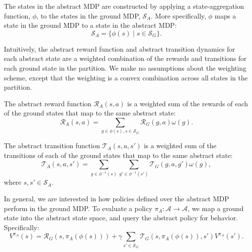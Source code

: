 
The states in the abstract \ac{MDP} are constructed by applying a state-aggregation function, $\phi$, to the states in the ground \ac{MDP}, $\mathcal{S}_A$. More specifically, $\phi$ maps a state in the ground \ac{MDP} to a state in the abstract \ac{MDP}:
\begin{equation}
\mathcal{S}_A = \{ \phi(s) \mid s \in \mathcal{S}_G\}.
\end{equation}

Intuitively, the abstract reward function and abstract transition dynamics for each abstract state are a weighted combination of the rewards and transitions for each ground state in the partition. We make no assumptions about the weighting scheme, except that the weighting is a convex combination across all states in the partition.

The abstract reward function $\mathcal{R}_A(s,a)$ is a weighted sum of the rewards of each of the ground states that map to the same abstract state:
\begin{equation}
\mathcal{R}_A(s,a) = \sum_{g \in \phi(s), s \in \mathcal{S}_G} \mathcal{R}_G(g,a) \omega(g) .
\end{equation}

The abstract transition function $\mathcal{T}_A(s,a,s')$ is a weighted sum of the transitions of each of the ground states that map to the same abstract state:
\begin{equation}
\mathcal{T}_A(s,a,s') = \sum_{g \in \phi^{-1}(s)} \sum_{g' \in \phi^{-1}(s')} \mathcal{T}_G(g,a,g') \omega(g),
\end{equation}
\noindent where $
s, s' \in \mathcal{S}_A
$.

In general, we are interested in how policies defined over the abstract \ac{MDP} perform in the ground \ac{MDP}. To evaluate a policy $\pi_A:\mathcal{A}\rightarrow\mathcal{A}$, we map a ground state into the abstract state space, and query the abstract policy for behavior. Specifically:
\begin{equation}
V^{\pi_A}(s) = \mathcal{R}_G(s,\pi_A(\phi(s))) + \gamma \sum_{s' \in \mathcal{S}_G} \mathcal{T}_G(s,\pi_A(\phi(s)),s')V^{\pi_A}(s').
\end{equation}


